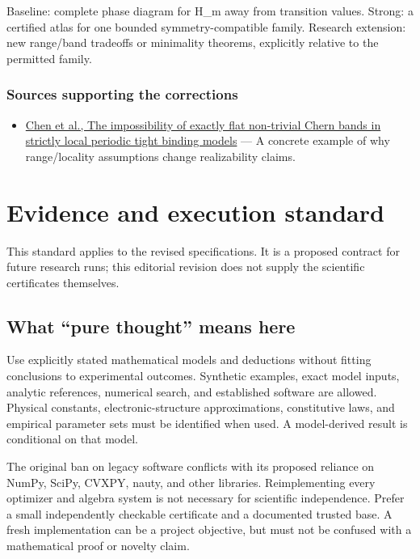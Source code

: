 \documentclass[
  11pt,
]{article}
\providecommand{\tightlist}{%
  \setlength{\itemsep}{0pt}\setlength{\parskip}{0pt}}
\begin{document}
Baseline: complete phase diagram for H\_m away from transition values.
Strong: a certified atlas for one bounded symmetry-compatible family.
Research extension: new range/band tradeoffs or minimality theorems,
explicitly relative to the permitted family.

\subsubsection{Sources supporting the corrections}

\begin{itemize}
\tightlist
\item
  \href{https://arxiv.org/abs/1311.4956}{Chen et al., The impossibility
  of exactly flat non-trivial Chern bands in strictly local periodic
  tight binding models} --- A concrete example of why range/locality
  assumptions change realizability claims.
\end{itemize}

\section{Evidence and execution standard}

This standard applies to the revised specifications. It is a proposed
contract for future research runs; this editorial revision does not
supply the scientific certificates themselves.

\subsection{What ``pure thought'' means here}

Use explicitly stated mathematical models and deductions without fitting
conclusions to experimental outcomes. Synthetic examples, exact model
inputs, analytic references, numerical search, and established software
are allowed. Physical constants, electronic-structure approximations,
constitutive laws, and empirical parameter sets must be identified when
used. A model-derived result is conditional on that model.

The original ban on legacy software conflicts with its proposed reliance
on NumPy, SciPy, CVXPY, nauty, and other libraries. Reimplementing every
optimizer and algebra system is not necessary for scientific
independence. Prefer a small independently checkable certificate and a
documented trusted base. A fresh implementation can be a project
objective, but must not be confused with a mathematical proof or novelty
claim.
\end{document}
